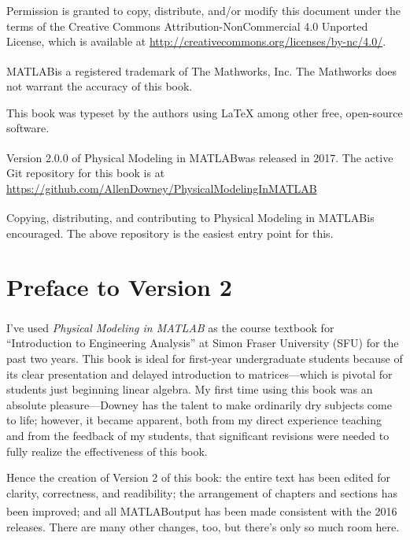 \documentclass[
]{book}
\numberwithin{Answer}{chapter}
\numberwithin{Exercise}{chapter}
\newcommand{\myreg}{\textsuperscript{{\tiny \textregistered}}}
\newcommand{\thetitle}{Physical Modeling in MATLAB\myreg}
\begin{document}
\vspace{2em}

Permission is granted to copy, distribute, and/or modify this document
under the terms of the Creative Commons Attribution-NonCommercial 4.0 Unported
License, which is available at \url{http://creativecommons.org/licenses/by-nc/4.0/}.

MATLAB\myreg is a registered trademark of The
Mathworks, Inc.  The Mathworks does not warrant the accuracy
of this book.

\vspace{2em}

This book was typeset by the authors using \LaTeX
among other free, open-source software.

Version 2.0.0 of \thetitle was released in 2017. The active Git
    repository for this book is at
    \url{https://github.com/AllenDowney/PhysicalModelingInMATLAB}


Copying, distributing, and contributing to \thetitle is encouraged.
The above repository is the easiest entry point for this.

\chapter{Preface to Version 2}

I've used \textit{\thetitle} as the course
textbook for ``Introduction to Engineering Analysis'' at Simon Fraser
University (SFU) for the past two years. This book is ideal for
first-year undergraduate students because of its clear presentation and
delayed introduction to matrices---which is pivotal for students
just beginning linear algebra.  My first time using this book was an
absolute pleasure---Downey has the talent to make ordinarily dry
subjects come to life; however, it became apparent, both from my direct
experience teaching and from the feedback of my students, that
significant revisions were needed to fully realize the effectiveness
of this book.

Hence the creation of Version 2 of this book: the entire text
has been edited for clarity, correctness, and readibility; the
arrangement of chapters and sections has been improved;
and all MATLAB\myreg output has been made consistent
with the 2016 releases. There are many other
changes, too, but there's only so much room here.
\end{document}
